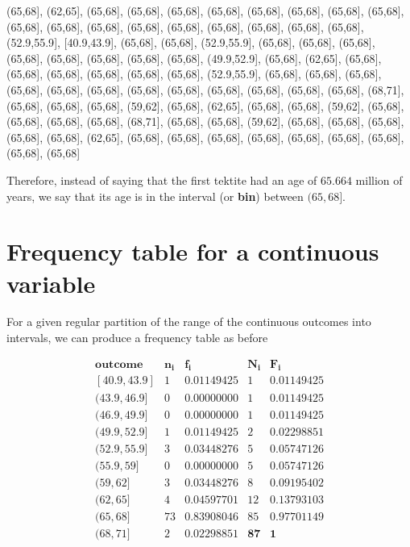 \documentclass[
]{book}
\begin{document}
(65,68{]}, (62,65{]}, (65,68{]}, (65,68{]}, (65,68{]}, (65,68{]}, (65,68{]}, (65,68{]}, (65,68{]}, (65,68{]}, (65,68{]}, (65,68{]}, (65,68{]}, (65,68{]}, (65,68{]}, (65,68{]}, (65,68{]}, (65,68{]}, (65,68{]}, (52.9,55.9{]}, {[}40.9,43.9{]}, (65,68{]}, (65,68{]}, (52.9,55.9{]}, (65,68{]}, (65,68{]}, (65,68{]}, (65,68{]}, (65,68{]}, (65,68{]}, (65,68{]}, (65,68{]}, (49.9,52.9{]}, (65,68{]}, (62,65{]}, (65,68{]}, (65,68{]}, (65,68{]}, (65,68{]}, (65,68{]}, (65,68{]}, (52.9,55.9{]}, (65,68{]}, (65,68{]}, (65,68{]}, (65,68{]}, (65,68{]}, (65,68{]}, (65,68{]}, (65,68{]}, (65,68{]}, (65,68{]}, (65,68{]}, (65,68{]}, (68,71{]}, (65,68{]}, (65,68{]}, (65,68{]}, (59,62{]}, (65,68{]}, (62,65{]}, (65,68{]}, (65,68{]}, (59,62{]}, (65,68{]}, (65,68{]}, (65,68{]}, (65,68{]}, (68,71{]}, (65,68{]}, (65,68{]}, (59,62{]}, (65,68{]}, (65,68{]}, (65,68{]}, (65,68{]}, (65,68{]}, (62,65{]}, (65,68{]}, (65,68{]}, (65,68{]}, (65,68{]}, (65,68{]}, (65,68{]}, (65,68{]}, (65,68{]}, (65,68{]}

Therefore, instead of saying that the first tektite had an age of \(65.664\) million of years, we say that its age is in the interval (or \textbf{bin}) between \((65,68]\).

\hypertarget{frequency-table-for-a-continuous-variable}{%
\section{Frequency table for a continuous variable}\label{frequency-table-for-a-continuous-variable}}

For a given regular partition of the range of the continuous outcomes into intervals, we can produce a frequency table as before

\[
\begin{array}{ccccc}
\mathbf{outcome} & \mathbf{n_i} & \mathbf{f_i} & \mathbf{N_i} & \mathbf{F_i}\\
\mathrm{[40.9,43.9]} & 1 & 0.01149425 &  1 & 0.01149425 \\ 
\mathrm{(43.9,46.9]} & 0 & 0.00000000 & 1 & 0.01149425 \\ 
\mathrm{(46.9,49.9]} & 0 & 0.00000000 &  1 & 0.01149425 \\ 
\mathrm{(49.9,52.9]} & 1 & 0.01149425 & 2 & 0.02298851 \\ 
\mathrm{(52.9,55.9]} & 3 & 0.03448276 &  5 & 0.05747126 \\ 
\mathrm{(55.9,59]} & 0 & 0.00000000 &  5 & 0.05747126 \\ 
\mathrm{(59,62]} & 3 & 0.03448276 &  8 & 0.09195402 \\ 
\mathrm{(62,65]} & 4 & 0.04597701 & 12 & 0.13793103 \\ 
\mathrm{(65,68]} & 73 & 0.83908046 & 85 & 0.97701149 \\ 
\mathrm{(68,71]} & 2 & 0.02298851 & \mathbf{87} & \mathbf{1} \\
\end{array}
\]
\end{document}
